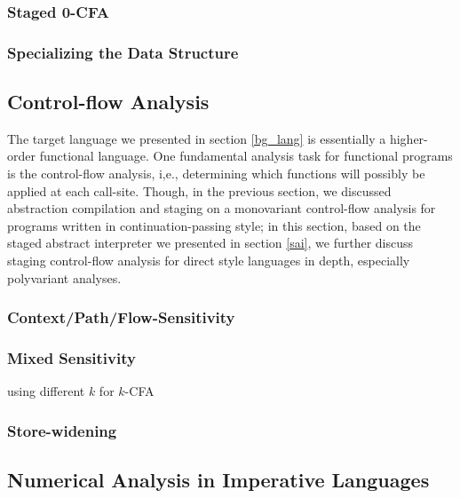 \subsubsection{Staged 0-CFA}

\subsubsection{Specializing the Data Structure}


\subsection{Control-flow Analysis}

The target language we presented in section \ref{bg_lang} is essentially a higher-order functional language.
One fundamental analysis task for functional programs is the control-flow analysis, i,e., determining
which functions will possibly be applied at each call-site. 
Though, in the previous section, we discussed abstraction compilation and staging on a monovariant 
control-flow analysis for programs written in continuation-passing style; 
in this section, based on the staged abstract interpreter we presented in section \ref{sai}, 
we further discuss staging control-flow analysis for direct style languages in depth, 
especially polyvariant analyses.

\subsubsection{Context/Path/Flow-Sensitivity}

\subsubsection{Mixed Sensitivity}

using different $k$ for $k$-CFA

\subsubsection{Store-widening}


\subsection{Numerical Analysis in Imperative Languages} \label{cases_imp}

